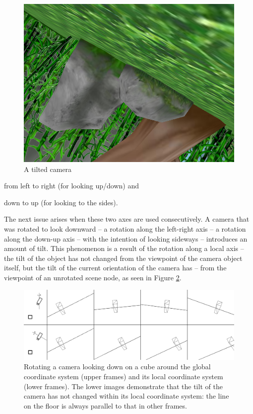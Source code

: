 	\begin{figure}[htbp]
		\centering
		\includegraphics[width=14cm]{images/tiltedcamera/cam.png}
		\caption{A tilted camera}
		\label{fig:TiltedCamera}
	\end{figure}

	\begin{smalllist}
		\item from left to right (for looking up/down) and
		\item down to up (for looking to the sides).
	\end{smalllist}

	The next issue arises when these two axes are used consecutively. A camera that was rotated to look downward -- a rotation along the left-right axis -- a rotation along the down-up axis -- with the intention of looking sideways -- introduces an amount of tilt. This phenomenon is a result of the rotation along a local axis -- the tilt of the object has not changed from the viewpoint of the camera object itself, but the tilt of the current orientation of the camera has -- from the viewpoint of an unrotated scene node, as seen in Figure \ref{fig:CameraRotation}.

	\begin{figure}[htbp]
		\centering
		\includegraphics[width=14cm]{images/camera/camera.png}
		\caption{Rotating a camera looking down on a cube around the global coordinate system (upper frames) and its local coordinate system (lower frames). The lower images demonstrate that the tilt of the camera has not changed within its local coordinate system: the line on the floor is always parallel to that in other frames.}
		\label{fig:CameraRotation}
	\end{figure}


